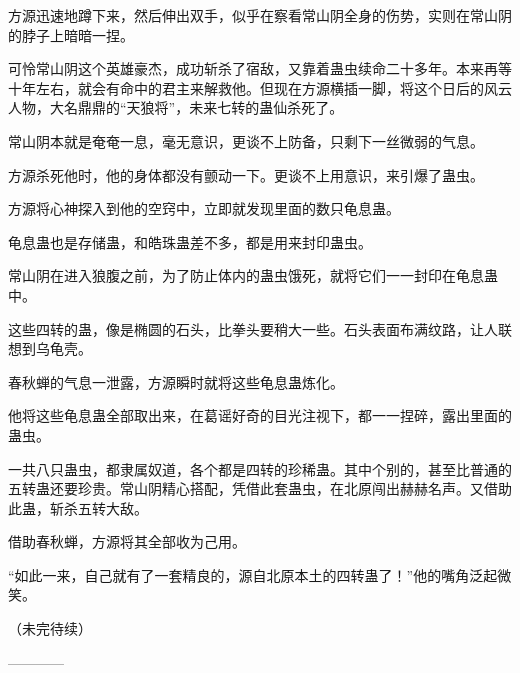 \begin{this_body}
方源迅速地蹲下来，然后伸出双手，似乎在察看常山阴全身的伤势，实则在常山阴的脖子上暗暗一捏。

可怜常山阴这个英雄豪杰，成功斩杀了宿敌，又靠着蛊虫续命二十多年。本来再等十年左右，就会有命中的君主来解救他。但现在方源横插一脚，将这个日后的风云人物，大名鼎鼎的“天狼将”，未来七转的蛊仙杀死了。

常山阴本就是奄奄一息，毫无意识，更谈不上防备，只剩下一丝微弱的气息。

方源杀死他时，他的身体都没有颤动一下。更谈不上用意识，来引爆了蛊虫。

方源将心神探入到他的空窍中，立即就发现里面的数只龟息蛊。

龟息蛊也是存储蛊，和皓珠蛊差不多，都是用来封印蛊虫。

常山阴在进入狼腹之前，为了防止体内的蛊虫饿死，就将它们一一封印在龟息蛊中。

这些四转的蛊，像是椭圆的石头，比拳头要稍大一些。石头表面布满纹路，让人联想到乌龟壳。

春秋蝉的气息一泄露，方源瞬时就将这些龟息蛊炼化。

他将这些龟息蛊全部取出来，在葛谣好奇的目光注视下，都一一捏碎，露出里面的蛊虫。

一共八只蛊虫，都隶属奴道，各个都是四转的珍稀蛊。其中个别的，甚至比普通的五转蛊还要珍贵。常山阴精心搭配，凭借此套蛊虫，在北原闯出赫赫名声。又借助此蛊，斩杀五转大敌。

借助春秋蝉，方源将其全部收为己用。

“如此一来，自己就有了一套精良的，源自北原本土的四转蛊了！”他的嘴角泛起微笑。

（未完待续）

------------

\end{this_body}

